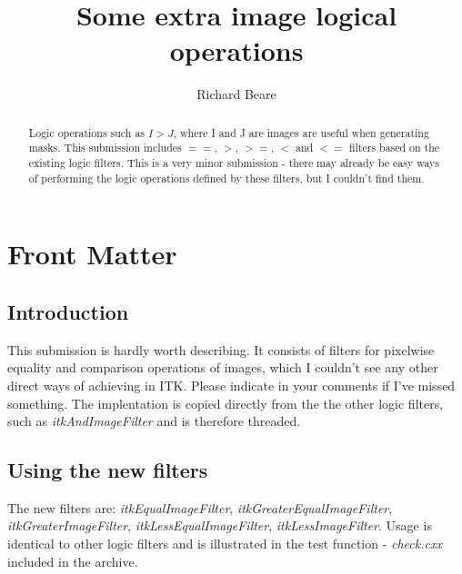 \documentclass{InsightArticle}
\title{Some extra image logical operations}
\author{Richard Beare}
\begin{document}
\maketitle

\ifhtml
\chapter*{Front Matter\label{front}}
\fi


\begin{abstract}
\noindent
Logic operations such as $I > J$, where I and J are images are useful
when generating masks. This submission includes $==$, $>$, $>=$, $<$
and $<=$ filters based on the existing logic filters. This is a very
minor submission - there may already be easy ways of performing the
logic operations defined by these filters, but I couldn't find them.
\end{abstract}

\tableofcontents

\section{Introduction}
This submission is hardly worth describing. It consists of filters for
pixelwise equality and comparison operations of images, which I
couldn't see any other direct ways of achieving in ITK. Please
indicate in your comments if I've missed something. The implentation
is copied directly from the the other logic filters, such as {\em
itkAndImageFilter} and is therefore threaded.

\section{Using the new filters}
The new filters are: {\em itkEqualImageFilter}, {\em
itkGreaterEqualImageFilter}, {\em itkGreaterImageFilter}, {\em
itkLessEqualImageFilter}, {\em itkLessImageFilter}. Usage is identical
to other logic filters and is illustrated in the test function - {\em check.cxx}
included in the archive.
\end{document}

